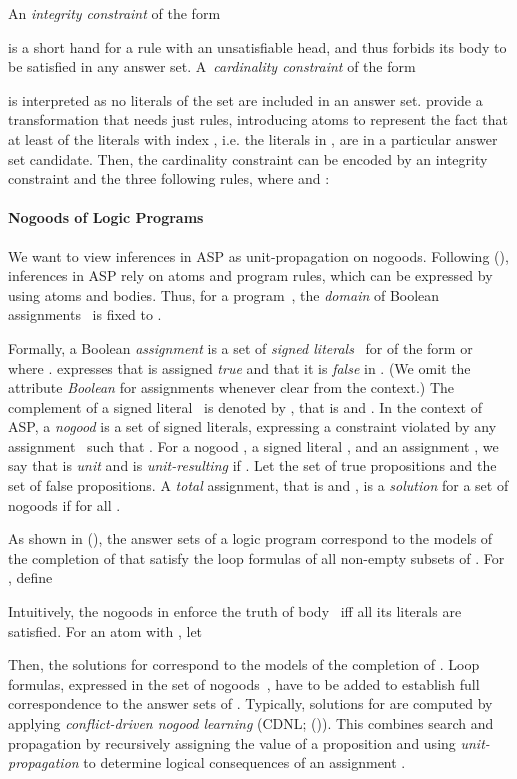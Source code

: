 \documentclass[letterpaper]{article}
\newcommand{\citeap}[1]{\citeauthor{#1} (\citeyear{#1})}
\begin{document}
An \emph{integrity constraint} of the form

is a short hand for a rule with an unsatisfiable head, and thus forbids its body to be satisfied in any answer set.
A~\emph{cardinality constraint} of the form

is interpreted as no  literals of the set  are included in an answer set.
\citeauthor{siniso02a} provide a transformation that needs just  rules, introducing atoms  to represent the fact that at least  of the literals with index , i.e. the literals in ,
 are in a particular answer set candidate. Then, the cardinality constraint can be encoded by an integrity constraint  and the three following rules, where  and :



\paragraph{Nogoods of Logic Programs}
We want to view inferences in ASP as unit-propagation on nogoods. 
Following \citeap{gekanesc07a}, inferences in ASP rely on atoms and program rules, which can be expressed by using atoms and bodies. Thus, for a program~, the \emph{domain} of Boolean assignments~ is fixed to .

Formally, a Boolean \emph{assignment}  is a set  of \emph{signed literals}~ for  of the form  or  where .  expresses that  is assigned \emph{true} and  that it is \emph{false} in . (We omit the attribute \emph{Boolean} for assignments whenever clear from the context.) The complement of a signed literal~ is denoted by , that is  and .
In the context of ASP, a \emph{nogood} is a set  of signed literals, expressing a constraint violated by any assignment~ such that .
For a nogood , a signed literal , and an assignment , we say that  is \emph{unit} and  is \emph{unit-resulting} if .
Let  the set of true propositions and  the set of false propositions. A \emph{total} assignment, that is  and , is a \emph{solution} for a set  of nogoods if  for all .

As shown in \citeap{lee05a}, the answer sets of a logic program  correspond to the models of the completion of  that satisfy the loop formulas of all non-empty subsets of . For , define

Intuitively, the nogoods in  enforce the truth of body~ iff all its literals are satisfied.
For an atom  with , let

Then, the solutions for  correspond to the models of the completion of . Loop formulas, expressed in the set of nogoods~, have to be added to establish full correspondence to the answer sets of .
Typically, solutions for  are computed by applying \emph{conflict-driven nogood learning} (CDNL; \citeap{gekanesc07a}). This combines search and propagation by recursively assigning the value of a proposition and using \emph{unit-propagation} to determine logical consequences of an assignment \cite{mitchell05a}.
\end{document}
